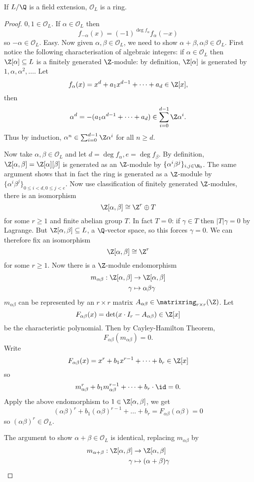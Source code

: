 \documentclass[a4paper]{article}
\renewcommand*{\O}{\mathcal{O}}
\begin{document}
\begin{proposition}
  If \(L/\Q\) is a field extension, \(\O_L\) is a ring.
\end{proposition}

\begin{proof}
  \(0, 1 \in \O_L\). If \(\alpha \in \O_L\) then
  \[
    f_{-\alpha}(x) = (-1)^{\deg f_\alpha} f_\alpha(-x)
  \]
  so \(-\alpha \in \O_L\). Easy. Now given \(\alpha, \beta \in \O_L\), we need to show \(\alpha + \beta, \alpha\beta \in \O_L\). First notice the following characterisation of algebraic integers: if \(\alpha \in \O_L\) then \(\Z[\alpha] \subseteq L\) is a finitely generated \(\Z\)-module: by definition, \(\Z[\alpha]\) is generated by \(1, \alpha, \alpha^2, \dots\). Let
  \[
    f_\alpha(x) = x^d + a_1x^{d - 1} + \dots + a_d \in \Z[x],
  \]
  then
  \[
    \alpha^d = -(a_1\alpha^{d - 1} + \dots + a_d) \in \sum_{i = 0}^{d - 1} \Z \alpha^i.
  \]
  Thus by induction, \(\alpha^n \in \sum_{i = 0}^{d - 1}\Z \alpha^i\) for all \(n \geq d\).

  Now take \(\alpha, \beta \in \O_L\) and let \(d = \deg f_\alpha, e = \deg f_\beta\). By definition, \(\Z[\alpha, \beta] = \Z[\alpha][\beta]\) is generated as an \(\Z\)-module by \(\{\alpha^i\beta^j\}_{i, j \in \N_0}\). The same argument shows that in fact the ring is generated as a \(\Z\)-module by \(\{\alpha^i\beta^j\}_{0 \leq i < d, 0 \leq j < e}\). Now use classification of finitely generated \(\Z\)-modules, there is an isomorphism
  \[
    \Z[\alpha, \beta] \cong \Z^r \oplus T
  \]
  for some \(r \geq 1\) and finite abelian group \(T\). In fact \(T = 0\): if \(\gamma \in T\) then \(|T|\gamma = 0\) by Lagrange. But \(\Z[\alpha, \beta] \subseteq L\), a \(\Q\)-vector space, so this forces \(\gamma = 0\). We can therefore fix an isomorphism
  \[
    \Z[\alpha, \beta] \cong \Z^r
  \]
  for some \(r \geq 1\). Now there is a \(\Z\)-module endomorphism
  \begin{align}
    m_{\alpha\beta}: \Z[\alpha, \beta] &\to \Z[\alpha, \beta] \\
    \gamma &\mapsto \alpha\beta\gamma
  \end{align}
  \(m_{\alpha\beta}\) can be represented by an \(r \times r\) matrix \(A_{\alpha\beta} \in \matrixring_{r \times r}(\Z)\). Let
  \[
    F_{\alpha\beta}(x) = \det(x \cdot I_r - A_{\alpha\beta}) \in \Z[x]
  \]
  be the characteristic polynomial. Then by Cayley-Hamilton Theorem,
  \[
    F_{\alpha\beta}(m_{\alpha\beta}) = 0.
  \]
  Write
  \[
    F_{\alpha\beta}(x) = x^r + b_1x^{r - 1} + \dots + b_r \in \Z[x]
  \]
  so
  \[
    m_{\alpha\beta}^r + b_1m_{\alpha\beta}^{r - 1} + \dots + b_r \cdot \id = 0.
  \]
  Apply the above endomorphism to \(1 \in \Z[\alpha, \beta]\), we get
  \[
    (\alpha\beta)^r + b_1(\alpha\beta)^{r - 1} + \dots + b_r = F_{\alpha\beta}(\alpha\beta) = 0
  \]
  so \((\alpha\beta)^r \in \O_L\).

  The argument to show \(\alpha + \beta \in \O_L\) is identical, replacing \(m_{\alpha\beta}\) by
  \begin{align*}
    m_{\alpha + \beta}: \Z[\alpha, \beta] &\to \Z[\alpha, \beta] \\
    \gamma &\mapsto (\alpha + \beta)\gamma
  \end{align*}
\end{proof}
\end{document}
